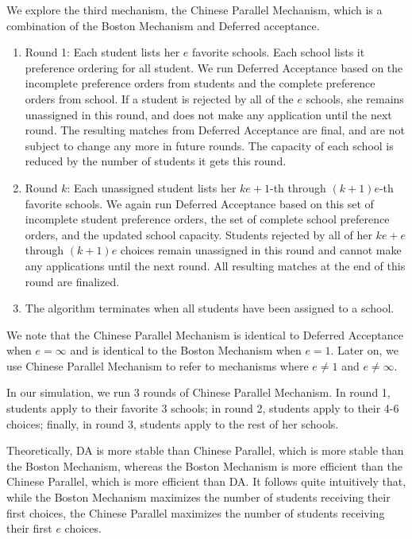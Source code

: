 \documentclass{article}
\begin{document}
We explore the third mechanism, the Chinese Parallel Mechanism, which is a combination of the Boston Mechanism and Deferred acceptance. 

\begin{enumerate}
  \item Round 1: Each student lists her $e$ favorite schools. Each school lists it preference ordering for all student. We run Deferred Acceptance based on the incomplete preference orders from students and the complete preference orders from school. If a student is rejected by all of the $e$ schools, she remains unassigned in this round, and does not make any application until the next round. The resulting matches from Deferred Acceptance are final, and are not subject to change any more in future rounds. The capacity of each school is reduced by the number of students it gets this round. 

  \item Round $k$: Each unassigned student lists her $ke+1$-th through $(k+1)e$-th favorite schools. We again run Deferred Acceptance based on this set of incomplete student preference orders, the set of complete school preference orders, and the updated school capacity. Students rejected by all of her $ke + e$ through $(k+1)e$ choices remain unassigned in this round and cannot make any applications until the next round. All resulting matches at the end of this round are finalized. 

  \item The algorithm terminates when all students have been assigned to a school.
\end{enumerate}

We note that the Chinese Parallel Mechanism is identical to Deferred Acceptance when $e = \infty$ and is identical to the Boston Mechanism when $e = 1$. Later on, we use Chinese Parallel Mechanism to refer to mechanisms where $e \not=1$ and $e\not = \infty. $

In our simulation, we run 3 rounds of Chinese Parallel Mechanism. In round 1, students apply to their favorite 3 schools; in round 2, students apply to their 4-6 choices; finally, in round 3, students apply to the rest of her schools. 

Theoretically, DA is more stable than Chinese Parallel, which is more stable than the Boston Mechanism, whereas the Boston Mechanism is more efficient than the Chinese Parallel, which is more efficient than DA. It follows quite intuitively that, while the Boston Mechanism maximizes the number of students receiving their first choices, the Chinese Parallel maximizes the number of students receiving their first $e$ choices. 
\end{document}
